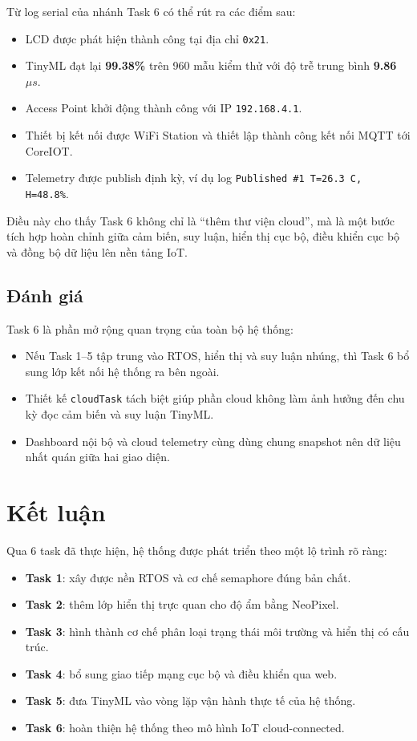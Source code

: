 \documentclass[12pt,a4paper]{article}
\begin{document}
Từ log serial của nhánh Task 6 có thể rút ra các điểm sau:
\begin{itemize}
  \item LCD được phát hiện thành công tại địa chỉ \texttt{0x21}.
  \item TinyML đạt lại \textbf{99.38\%} trên 960 mẫu kiểm thử với độ trễ trung bình \textbf{9.86 $\mu s$}.
  \item Access Point khởi động thành công với IP \texttt{192.168.4.1}.
  \item Thiết bị kết nối được WiFi Station và thiết lập thành công kết nối MQTT tới CoreIOT.
  \item Telemetry được publish định kỳ, ví dụ log \texttt{Published \#1 T=26.3 C, H=48.8\%}.
\end{itemize}

Điều này cho thấy Task 6 không chỉ là ``thêm thư viện cloud'', mà là một bước tích hợp hoàn chỉnh giữa cảm biến, suy luận, hiển thị cục bộ, điều khiển cục bộ và đồng bộ dữ liệu lên nền tảng IoT.

\subsection{Đánh giá}

Task 6 là phần mở rộng quan trọng của toàn bộ hệ thống:
\begin{itemize}
  \item Nếu Task 1--5 tập trung vào RTOS, hiển thị và suy luận nhúng, thì Task 6 bổ sung lớp kết nối hệ thống ra bên ngoài.
  \item Thiết kế \texttt{cloudTask} tách biệt giúp phần cloud không làm ảnh hưởng đến chu kỳ đọc cảm biến và suy luận TinyML.
  \item Dashboard nội bộ và cloud telemetry cùng dùng chung snapshot nên dữ liệu nhất quán giữa hai giao diện.
\end{itemize}

\section{Kết luận}

Qua 6 task đã thực hiện, hệ thống được phát triển theo một lộ trình rõ ràng:
\begin{itemize}
  \item \textbf{Task 1}: xây được nền RTOS và cơ chế semaphore đúng bản chất.
  \item \textbf{Task 2}: thêm lớp hiển thị trực quan cho độ ẩm bằng NeoPixel.
  \item \textbf{Task 3}: hình thành cơ chế phân loại trạng thái môi trường và hiển thị có cấu trúc.
  \item \textbf{Task 4}: bổ sung giao tiếp mạng cục bộ và điều khiển qua web.
  \item \textbf{Task 5}: đưa TinyML vào vòng lặp vận hành thực tế của hệ thống.
  \item \textbf{Task 6}: hoàn thiện hệ thống theo mô hình IoT cloud-connected.
\end{itemize}
\end{document}
